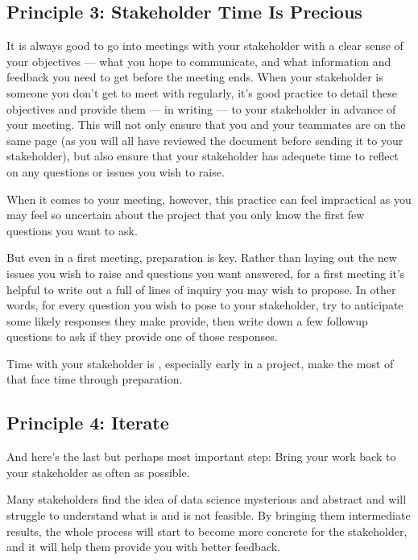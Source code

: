 \documentclass[letterpaper,10pt,english]{jupyterBook}
\begin{document}
\subsection{Principle 3: Stakeholder Time Is Precious}
\label{\detokenize{20_problems_to_questions/20_stakeholder_management:principle-3-stakeholder-time-is-precious}}
\sphinxAtStartPar
It is always good to go into meetings with your stakeholder with a clear sense of your objectives — what you hope to communicate, and what information and feedback you need to get before the meeting ends. When your stakeholder is someone you don’t get to meet with regularly, it’s good practice to detail these objectives and provide them — in writing — to your stakeholder in advance of your meeting. This will not only ensure that you and your teammates are on the same page (as you will all have reviewed the document before sending it to your stakeholder), but also ensure that your stakeholder has adequete time to reflect on any questions or issues you wish to raise.

\sphinxAtStartPar
When it comes to your  meeting, however, this practice can feel impractical as you may feel so uncertain about the project that you only know the first few questions you want to ask.

\sphinxAtStartPar
But even in a first meeting, preparation is key. Rather than laying out the new issues you wish to raise and questions you want answered, for a first meeting it’s helpful to write out a full  of lines of inquiry you may wish to propose. In other words, for every question you wish to pose to your stakeholder, try to anticipate some likely responses they make provide, then write down a few followup questions to ask if they provide one of those responses.

\sphinxAtStartPar
Time with your stakeholder is , especially early in a project, make the most of that face time through preparation.


\subsection{Principle 4: Iterate}
\label{\detokenize{20_problems_to_questions/20_stakeholder_management:principle-4-iterate}}
\sphinxAtStartPar
And here’s the last but perhaps most important step:  Bring your work back to your stakeholder as often as possible.

\sphinxAtStartPar
Many stakeholders find the idea of data science mysterious and abstract and will struggle to understand what is and is not feasible. By bringing them intermediate results, the whole process will start to become more concrete for the stakeholder, and it will help them provide you with better feedback.
\end{document}
